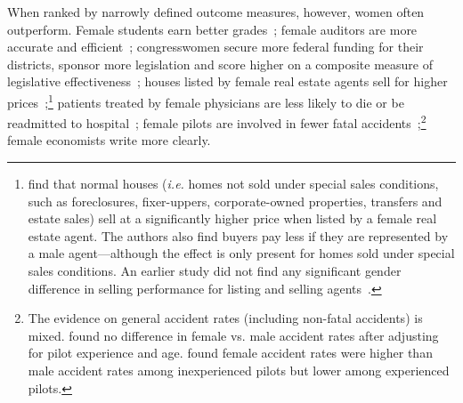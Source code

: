 When ranked by narrowly defined outcome measures, however, women often outperform. Female students earn better grades~\citep{Voyer2014}; female auditors are more accurate and efficient~\citep{Chung2001,ODonnell2001,Ittonen2013,Niskanen2011}; congresswomen secure more federal funding for their districts, sponsor more legislation and score higher on a composite measure of legislative effectiveness~\citep{Anzia2011,Volden2013}; houses listed by female real estate agents sell for higher prices~\citep{Seagraves2013,Salter2012};\footnote{\citet{Seagraves2013} find that normal houses (\emph{i.e.} homes not sold under special sales conditions, such as foreclosures, fixer-uppers, corporate-owned properties, transfers and estate sales) sell at a significantly higher price when listed by a female real estate agent. The authors also find buyers pay less if they are represented by a male agent---although the effect is only present for homes sold under special sales conditions. An earlier study did not find any significant gender difference in selling performance for listing and selling agents~\citep{Turnbull2007}.} patients treated by female physicians are less likely to die or be readmitted to hospital~\citep{Tsugawa2016}; female pilots are involved in fewer fatal accidents~\citep{Vail1986,Bazargan2011};\footnote{The evidence on general accident rates (including non-fatal accidents) is mixed.  \citet{McFadden1996} found no difference in female vs. male accident rates after adjusting for pilot experience and age.  \citet{Walton2016} found female accident rates were higher than male accident rates among inexperienced pilots but lower among experienced pilots.} female economists write more clearly.

